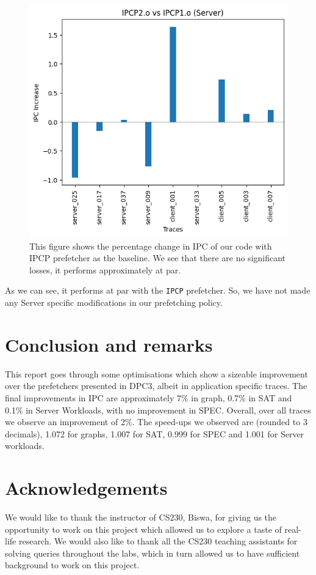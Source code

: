 \documentclass[conference]{IEEEtran}
\begin{document}
\begin{figure}
\includegraphics[scale=0.6]{Images/Bingo/server_client_final.png}
\caption{This figure shows the percentage change in IPC of our code with IPCP prefetcher as the baseline. We see that there are no significant losses, it performs approximately at par.}
\label{server_comp}
\end{figure}

As we can see, it performs at par with the \verb|IPCP| prefetcher. So, we have not made any Server specific modifications in our prefetching policy.

\section*{Conclusion and remarks}
This report goes through some optimisations which show a sizeable improvement over the prefetchers presented in DPC3, albeit in application specific traces. The final improvements in IPC are approximately 7\% in graph, 0.7\% in SAT and 0.1\% in Server Workloads, with no improvement in SPEC. Overall, over all traces we observe an improvement of 2\%. The speed-ups we observed are (rounded to 3 decimals), 1.072 for graphs, 1.007 for SAT, 0.999 for SPEC and 1.001 for Server workloads.

\section*{Acknowledgements}
We would like to thank the instructor of CS230, Biswa, for giving us the opportunity to work on this project which allowed us to explore a taste of real-life research. We would also like to thank all the CS230 teaching assistants for solving queries throughout the labs, which in turn allowed us to have sufficient background to work on this project. 
\end{document}
